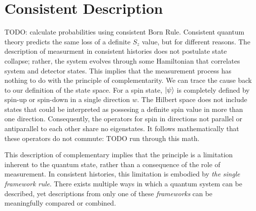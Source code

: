 \section{Consistent Description}
TODO: calculate probabilities using consistent Born Rule.
Consistent quantum theory predicts the same loss of a definite $S_z$ value, but for different reasons.
The description of measurment in consistent histories does not postulate state collapse; rather, the system evolves through some Hamiltonian that correlates system and detector states. This implies that the measurement process has nothing to do with the principle of complementarity. We can trace the cause back to our definition of the state space. For a spin state, $\ket{\psi}$ is completely defined by spin-up or spin-down in a single direction $w$. The Hilbert space does not include states that could be interpreted as possesing a definite spin value in more than one direction. Consequently, the operators for spin in directions not parallel or antiparallel to each other share no eigenstates. It follows mathematically that these operators do not commute: TODO run through this math.

This description of complementary implies that the principle is a limitation inherent to the quantum state, rather than a consequence of the role of measurement. In consistent histories, this limitation is embodied by \textit{the single framework rule}. There exists multiple ways in which a quantum system can be described, yet descriptions from only one of these \textit{frameworks} can be meaningfully compared or combined.

